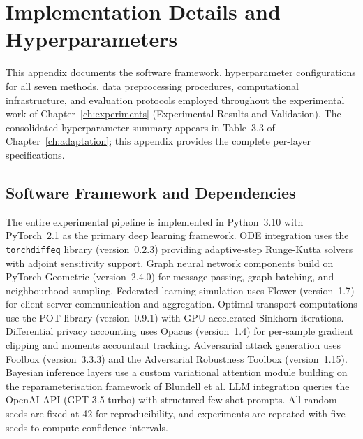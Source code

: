 
\chapter{Implementation Details and Hyperparameters}
\label{app:implementation}

This appendix documents the software framework, hyperparameter configurations for all seven methods, data preprocessing procedures, computational infrastructure, and evaluation protocols employed throughout the experimental work of Chapter~\ref{ch:experiments} (Experimental Results and Validation). The consolidated hyperparameter summary appears in Table~3.3 of Chapter~\ref{ch:adaptation}; this appendix provides the complete per-layer specifications.


\section{Software Framework and Dependencies}
\label{app:software}

The entire experimental pipeline is implemented in Python~3.10 with PyTorch~2.1 as the primary deep learning framework. ODE integration uses the \texttt{torchdiffeq} library (version~0.2.3) providing adaptive-step Runge-Kutta solvers with adjoint sensitivity support. Graph neural network components build on PyTorch Geometric (version~2.4.0) for message passing, graph batching, and neighbourhood sampling. Federated learning simulation uses Flower (version~1.7) for client-server communication and aggregation. Optimal transport computations use the POT library (version~0.9.1) with GPU-accelerated Sinkhorn iterations. Differential privacy accounting uses Opacus (version~1.4) for per-sample gradient clipping and moments accountant tracking. Adversarial attack generation uses Foolbox (version~3.3.3) and the Adversarial Robustness Toolbox (version~1.15). Bayesian inference layers use a custom variational attention module building on the reparameterisation framework of Blundell et al. LLM integration queries the OpenAI API (GPT-3.5-turbo) with structured few-shot prompts. All random seeds are fixed at 42 for reproducibility, and experiments are repeated with five seeds to compute confidence intervals.


